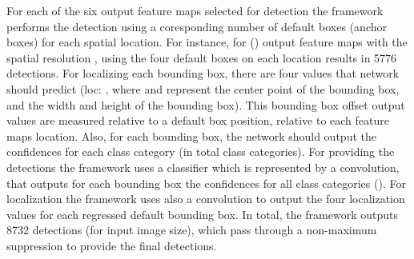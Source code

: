 \documentclass{article}
\begin{document}
\addtolength{\tabcolsep}{-8.3pt}
\begin{table*}[t]
\centering
\caption{PyConvSSD with  input image size (results on COCO val2017).}
\label{table:obj_det}
\end{table*}
\addtolength{\tabcolsep}{+8.3pt}

For each of the six output feature maps selected for detection        the framework performs the detection using a coresponding number of default boxes (anchor boxes)       for each spatial location. For instance, for () output feature maps with the spatial resolution , using the four default boxes on each location results in 5776 detections. 
For localizing each bounding box, there are four values  that  network should predict (loc: , where  and  represent the center point of the bounding box,   and  the width and height of the bounding box). This bounding box offset output values are measured relative to a default box position, relative to each feature maps location. Also, for each bounding box, the network should output the confidences for each class category (in total  class categories). For providing the detections the framework uses a classifier which is represented by a  convolution, that outputs for each bounding box the confidences for all class categories (). For localization the framework uses also a   convolution to output the four localization values for each regressed default bounding box. In total, the framework outputs 8732 detections (for  input image size), which pass through a non-maximum suppression to provide the final detections. 
\end{document}
